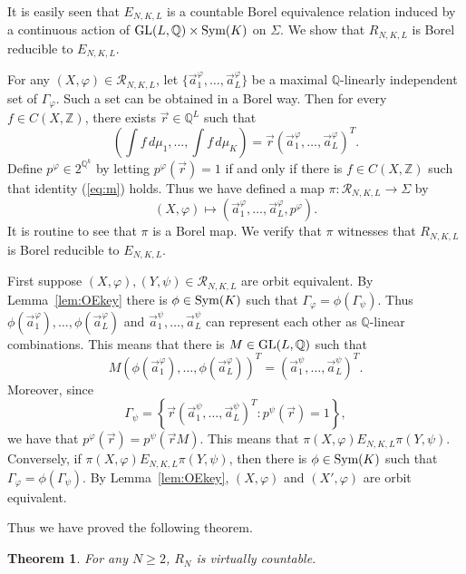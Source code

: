 \documentclass{amsart}
\newtheorem{theorem}{Theorem}[section]
\theoremstyle{definition}
\theoremstyle{problem}
\theoremstyle{remark}
\numberwithin{equation}{section}
\begin{document}
It is easily seen that $E_{N,K,L}$ is a countable Borel equivalence relation induced by a continuous action of $\mbox{\rm GL}(L,\mathbb{Q})\times \mbox{\rm Sym}(K)$ on $\Sigma$. We show that $R_{N,K,L}$ is Borel reducible to $E_{N,K,L}$.

For any $(X,\varphi)\in \mathcal{R}_{N,K,L}$, let $\{ {\vec{a}}^\varphi_1, \dots, \vec{a}^\varphi_L\}$ be  a maximal $\mathbb{Q}$-linearly independent set of $\Gamma_\varphi$. Such a set can be obtained in a Borel way. Then for every $f \in C(X,\mathbb Z)$, there exists $\vec{r}\in\mathbb{Q}^L$ such that 
\begin{equation}\label{eq:m}
\left(\int f\, d\mu_1, \dots, \int f\, d\mu_K\right)=\vec{r}(\vec{a}^\varphi_1, \dots, \vec{a}^\varphi_L)^T.
\tag{$\dagger$}
\end{equation} 
Define  $p^\varphi\in2^{\mathbb{Q}^k}$ by letting $p^\varphi(\vec{r})=1$ if and only if there is  $f \in C(X,\mathbb{Z})$ such that identity (\ref{eq:m}) holds. Thus  we have defined a map $\pi\colon \mathcal{R}_{N,K,L} \to \Sigma$ by
$$ (X,\varphi)\mapsto (\vec{a}^\varphi_1, \dots, \vec{a}^\varphi_L, p^\varphi). $$
It is routine to see that $\pi$ is a Borel map. We verify that $\pi$ witnesses that $R_{N,K,L}$ is Borel reducible  to $E_{N,K,L}$.

First suppose $(X,\varphi), (Y, \psi)\in \mathcal{R}_{N,K,L}$ are orbit equivalent. By Lemma~\ref{lem:OEkey} there is $\phi\in\mbox{\rm Sym}(K)$ such that $\Gamma_\varphi=\phi(\Gamma_\psi)$. Thus $\phi(\vec{a}^\varphi_1), \dots, \phi(\vec{a}^\varphi_L)$ and $\vec{a}^\psi_1, \dots, \vec{a}^\psi_L$ can represent each other as $\mathbb{Q}$-linear combinations. This means that there is $M\in\mbox{\rm GL}(L, \mathbb{Q})$ such that  
$$ M(\phi(\vec{a}^\varphi_1),\dots, \phi(\vec{a}^\varphi_L))^T=(\vec{a}^\psi_1,\dots, \vec{a}^\psi_L)^T. $$
Moreover, since 
$$ \Gamma_\psi=\left\{ \vec{r}(\vec{a}^\psi_1,\dots, \vec{a}^\psi_L)^T\colon p^\psi(\vec{r})=1\right\}, $$
we have that $p^\varphi(\vec{r})=p^\psi(\vec{r}M)$.  This means  that $\pi(X,\varphi)E_{N,K,L} \pi(Y,\psi)$.
Conversely, if $\pi(X,\varphi)E_{N,K,L} \pi(Y,\psi)$, then there is $\phi\in\mbox{\rm Sym}(K)$ such that $\Gamma_\varphi=\phi(\Gamma_\psi)$. By Lemma~\ref{lem:OEkey}, $(X,\varphi)$ and $(X',\varphi)$ are orbit equivalent.

Thus we have proved the following theorem.

\begin{theorem}\label{thm:rn} For any $N\geq 2$, $R_N$ is virtually countable.
\end{theorem}
\end{document}
